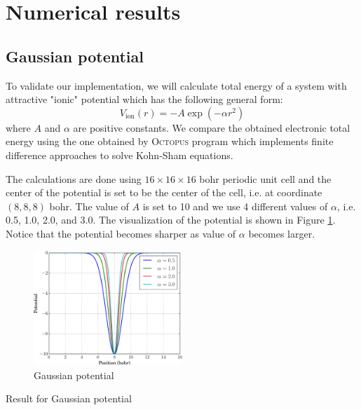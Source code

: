 \section{Numerical results}

\subsection{Gaussian potential}

To validate our implementation, we will calculate total energy of a system with
attractive "ionic" potential which has the following general form:
\begin{equation}
V_{\mathrm{ion}}(r) = -A\exp(-\alpha r^2)
\end{equation}
where $A$ and $\alpha$ are positive constants.
We compare the obtained electronic total energy using the one obtained by
\textsc{Octopus} program \cite{Marques2003,Castro2006,Xavier2015}
which implements finite difference approaches to solve Kohn-Sham equations.
 
The calculations are done using $16 \times 16 \times 16$ bohr periodic unit cell
and the center of the potential is set to be the center of the cell, i.e.
at coordinate $(8,8,8)$ bohr. The value of $A$ is set to 10 and we use 4 different
values of $\alpha$, i.e. 0.5, 1.0, 2.0, and 3.0. The visualization of the potential
is shown in Figure \ref{fig:gauss_pot}. Notice that the potential becomes sharper
as value of $\alpha$ becomes larger.
\begin{figure}[h]
{\centering
\includegraphics[width=0.5\textwidth]{images/V_gauss.pdf}
\par}
\caption{Gaussian potential}
\label{fig:gauss_pot}
\end{figure}

Result for Gaussian potential


